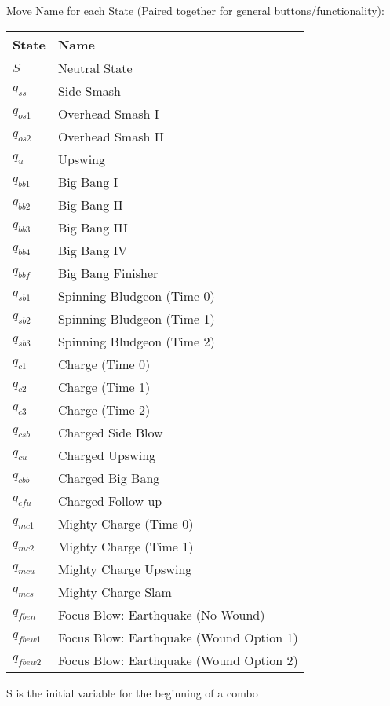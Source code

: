 \documentclass{article}
\begin{document}
\begin{mylist}
Move Name for each State (Paired together for general buttons/functionality): \\
\begin{table}[h] 
  \begin{tabular}{l | l}
    State & Name  \\
    \hline
    $S$ & Neutral State \\
    $q_{ss}$ & Side Smash \\
    $q_{os1}$ & Overhead Smash I \\
    $q_{os2}$ & Overhead Smash II \\
    $q_{u}$ & Upswing \\
    $q_{bb1}$ & Big Bang I \\
    $q_{bb2}$ & Big Bang II \\
    $q_{bb3}$ & Big Bang III \\
    $q_{bb4}$ & Big Bang IV \\
    $q_{bbf}$ & Big Bang Finisher\\
    $q_{sb1}$ & Spinning Bludgeon (Time 0)\\
    $q_{sb2}$ & Spinning Bludgeon (Time 1)\\
    $q_{sb3}$ & Spinning Bludgeon (Time 2)\\
    $q_{c1}$ & Charge (Time 0)\\
    $q_{c2}$ & Charge (Time 1)\\
    $q_{c3}$ & Charge (Time 2)\\
    $q_{csb}$ & Charged Side Blow\\
    $q_{cu}$ & Charged Upswing\\
    $q_{cbb}$ & Charged Big Bang\\
    $q_{cfu}$ & Charged Follow-up\\
    $q_{mc1}$ & Mighty Charge (Time 0)\\
    $q_{mc2}$ & Mighty Charge (Time 1)\\
    $q_{mcu}$ & Mighty Charge Upswing\\
    $q_{mcs}$ & Mighty Charge Slam\\
    $q_{fben}$ & Focus Blow: Earthquake (No Wound)\\
    $q_{fbew1}$ & Focus Blow: Earthquake (Wound Option 1)\\
    $q_{fbew2}$ & Focus Blow: Earthquake (Wound Option 2)\\
  \end{tabular}
\end{table}
S is the initial variable for the beginning of a combo

\end{mylist}
\end{document}
